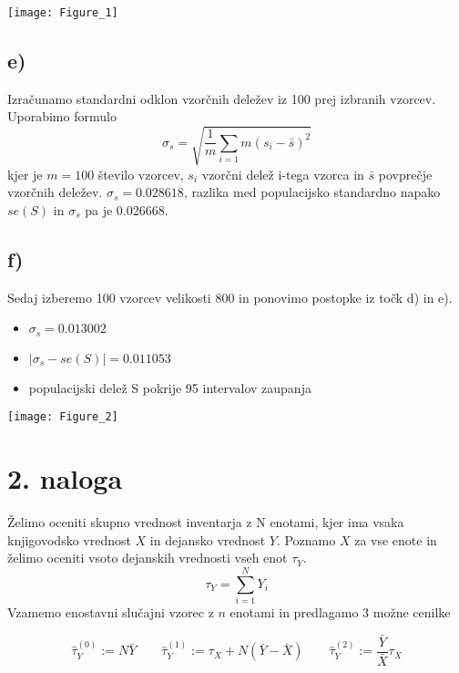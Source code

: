 \documentclass[A4paper, 11pt]{article}
\begin{document}
\texttt{[image: Figure\_1]}

\subsection*{e)}
Izračunamo standardni odklon vzorčnih deležev  iz 100 prej izbranih vzorcev. Uporabimo formulo
\[ \sigma_s = \sqrt{\frac{1}{m} \sum_{i=1}{m} (s_i - \bar{s})^2} \] 
kjer je $m=100$ število vzorcev, $s_i$ vzorčni delež i-tega vzorca in $\bar{s}$ povprečje vzorčnih deležev. 
$\sigma_s = 0.028618$, razlika med populacijsko standardno napako $se(S)$ in $\sigma_s$ pa je 0.026668. 

\newpage

\subsection*{f)}
Sedaj izberemo 100 vzorcev velikosti 800 in ponovimo postopke iz točk d) in e).
\begin{itemize}
\item $\sigma_s = 0.013002$
\item $| \sigma_s - se(S) | = 0.011053$
\item populacijski delež S pokrije 95 intervalov zaupanja
\end{itemize}

\texttt{[image: Figure\_2]}



\section*{2. naloga}

Želimo oceniti skupno vrednost inventarja z N enotami, kjer ima vsaka knjigovodsko vrednost $X$ in dejansko vrednost $Y$. Poznamo $X$ za vse enote in želimo oceniti vsoto dejanskih vrednosti vseh enot $\tau_Y$.
\[ \tau_Y = \sum_{i=1}^{N} Y_i \]
Vzamemo enostavni slučajni vzorec z $n$ enotami in predlagamo 3 možne cenilke

\[ \hat{\tau}_Y ^ {(0)} := N  \bar{Y} \qquad \hat{\tau}_Y ^ {(1)} := \tau_X + N ( \bar{Y} - \bar{X}) \qquad \hat{\tau}_Y ^ {(2)} := \frac{\bar{Y}}{\bar{X}} \tau_X \]
\end{document}
